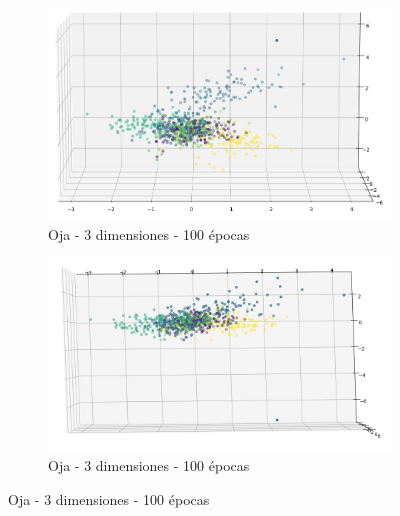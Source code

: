 \begin{figure}[!htbp]
\centering
\begin{subfigure}{.5\textwidth}
  \centering
  \includegraphics[width=1\linewidth, scale=1]{../img/ej1/oja/oja_3salida_100ep_train_2.png}
  \caption{Oja - 3 dimensiones - 100 épocas}
  \label{fig:sub1}
\end{subfigure}%
\begin{subfigure}{.5\textwidth}
  \centering
  \includegraphics[width=1\linewidth, scale=1]{../img/ej1/oja/oja_3salida_100ep_train_3.png}
  \caption{Oja - 3 dimensiones - 100 épocas}
  \label{fig:sub2}
\end{subfigure}
\end{figure}

\newpage

